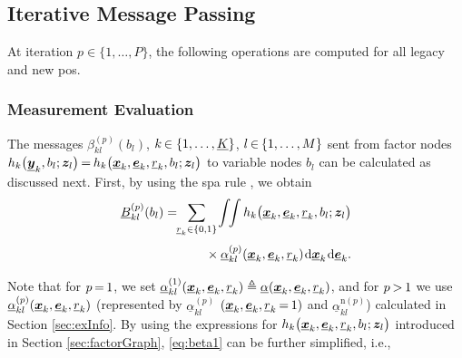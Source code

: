 \documentclass[10pt, twoside, romanappendices]{IEEEtran}
\providecommand{\ist}{\hspace*{.3mm}}
\providecommand{\rmv}{\hspace*{-.3mm}}
\providecommand{\nn}{\nonumber}
\begin{document}
\subsection{Iterative Message Passing}

At iteration $p \in \{1,\dots,P\}$, the following operations are computed for all legacy and new \acp{po}.

\subsubsection{Measurement Evaluation}
\label{sec:measEval}

The messages $\beta^{(p)}_{kl}(b_{l})$, $k \rmv\in \{1,\dots,\underline{K}\}$, $l \rmv\in\rmv \{1,\dots,M\}$ sent from factor nodes $h_k\big( \underline{\V{y}}_{k}, b_{l}; \V{z}_l \big) \rmv=\rmv h_k\big( \underline{\V{x}}_{k},  \underline{\V{e}}_{k}, \underline{r}_{k}, b_{l}; \V{z}_l \big)$ to variable nodes $b_{l}$ can be calculated \vspace{0mm} as discussed next. First, by using the \ac{spa} rule \cite[Eq.~(6)]{KscFreLoe:01}, we obtain
\begin{align}
\underline{B}_{kl}^{(p)}(b_{l}) &= \rmv\rmv\rmv\rmv \sum_{\underline{r}_{k} \in \{0,1\}} \rmv \int \rmv\rmv\rmv\rmv \int h_k\big( \underline{\V{x}}_{k},  \underline{\V{e}}_{k}, \underline{r}_{k}, b_{l}; \V{z}_l \big) \nn\\[1mm]
&\hspace{11.5mm}\times \underline{\alpha}_{kl}^{(p)}(\underline{\V{x}}_{k},\underline{\V{e}}_{k},\underline{r}_{k}) \ist \mathrm{d} \underline{\V{x}}_{k}\ist \mathrm{d} \underline{\V{e}}_{k}.  \label{eq:beta1}\\[-3.5mm]
\nn
\end{align}
Note that for $p \rmv=\rmv 1$, we set  $\underline{\alpha}_{kl}^{(1)}(\underline{\bm{x}}_{k},\underline{\bm{e}}_{k},\underline{r}_{k})  \triangleq \underline{\alpha}(\underline{\bm{x}}_{k}, \underline{\bm{e}}_{k},\underline{r}_{k})$, and for $p\rmv>\rmv1$ we use $\underline{\alpha}_{kl}^{(p)}(\underline{\bm{x}}_{k},\underline{\bm{e}}_{k},\underline{r}_{k})$ (represented by $\underline{\alpha}_{kl}^{(p)}$ $(\underline{\V{x}}_{k},\underline{\V{e}}_{k},\underline{r}_{k} \rmv=\rmv 1)$ and $\underline{\alpha}^{\mathrm{n}(p)}_{kl}$) calculated in Section \ref{sec:exInfo}. By using the expressions for $h_k\big( \underline{\bm{x}}_{k},\underline{\bm{e}}_{k}, \underline{r}_{k}, b_{l}; \bm{z}_l \big)$ introduced in Section \ref{sec:factorGraph}, \eqref{eq:beta1} can be further simplified\vspace{.5mm}, i.e.,
\end{document}
